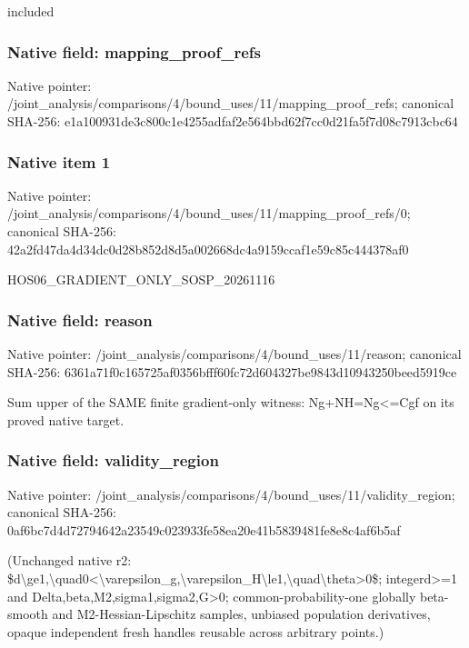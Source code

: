 \documentclass[10pt,a4paper]{article}
\begin{document}
\begingroup\raggedright\sloppy included\par\endgroup

\subsubsection{Native field: mapping\_\allowbreak{}proof\_\allowbreak{}refs}
Native pointer: /joint\_\allowbreak{}analysis/comparisons/4/bound\_\allowbreak{}uses/11/mapping\_\allowbreak{}proof\_\allowbreak{}refs; canonical SHA-256: e1a100931de3c800c1e4255adfaf2e564bbd62f7cc0d21fa5f7d08c7913cbc64

\subsubsection{Native item 1}
Native pointer: /joint\_\allowbreak{}analysis/comparisons/4/bound\_\allowbreak{}uses/11/mapping\_\allowbreak{}proof\_\allowbreak{}refs/0; canonical SHA-256: 42a2fd47da4d34dc0d28b852d8d5a002668dc4a9159ccaf1e59c85c444378af0

\begingroup\raggedright\sloppy HOS06\_\allowbreak{}GRADIENT\_\allowbreak{}ONLY\_\allowbreak{}SOSP\_\allowbreak{}20261116\par\endgroup

\subsubsection{Native field: reason}
Native pointer: /joint\_\allowbreak{}analysis/comparisons/4/bound\_\allowbreak{}uses/11/reason; canonical SHA-256: 6361a71f0c165725af0356bfff60fc72d604327be9843d10943250beed5919ce

\begingroup\raggedright\sloppy Sum upper of the SAME finite gradient-only witness:\allowbreak{} Ng+NH=\allowbreak{}Ng<=\allowbreak{}Cgf on its proved native target.\par\endgroup

\subsubsection{Native field: validity\_\allowbreak{}region}
Native pointer: /joint\_\allowbreak{}analysis/comparisons/4/bound\_\allowbreak{}uses/11/validity\_\allowbreak{}region; canonical SHA-256: 0af6bc7d4d72794642a23549c023933fe58ea20e41b5839481fe8e8c4af6b5af

\begingroup\raggedright\sloppy (Unchanged native r2:\allowbreak{} \$d\textbackslash{}ge1,\allowbreak{}\textbackslash{}quad0<\textbackslash{}varepsilon\_\allowbreak{}g,\allowbreak{}\textbackslash{}varepsilon\_\allowbreak{}H\textbackslash{}le1,\allowbreak{}\textbackslash{}quad\textbackslash{}theta>0\$;\allowbreak{} integerd>=\allowbreak{}1 and Delta,\allowbreak{}beta,\allowbreak{}M2,\allowbreak{}sigma1,\allowbreak{}sigma2,\allowbreak{}G>0;\allowbreak{} common-probability-one globally beta-smooth and M2-Hessian-Lipschitz samples,\allowbreak{} unbiased population derivatives,\allowbreak{} opaque independent fresh handles reusable across arbitrary points.)\par\endgroup
\end{document}
